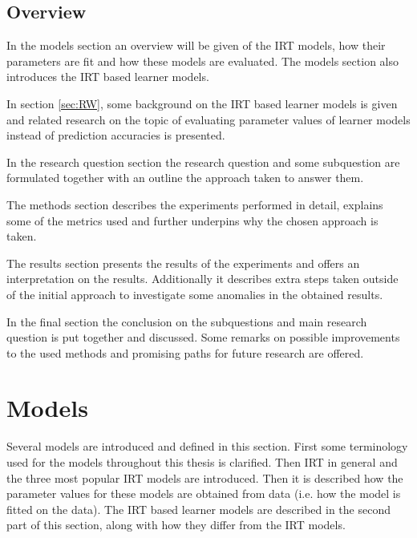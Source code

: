 \documentclass{scrartcl}
\begin{document}
\subsection{Overview}
In the models section an overview will be given of the IRT models, how their parameters are fit and how these models are evaluated. The models section also introduces the IRT based learner models.

In section \ref{sec:RW}, some background on the IRT based learner models is given and related research on the topic of evaluating parameter values of learner models instead of prediction accuracies is presented.

In the research question section the research question and some subquestion are formulated together with an outline the approach taken to answer them.

The methods section describes the experiments performed in detail, explains some of the metrics used and further underpins why the chosen approach is taken.

The results section presents the results of the experiments and offers an interpretation on the results. Additionally it describes extra steps taken outside of the initial approach to investigate some anomalies in the obtained results.

In the final section the conclusion on the subquestions and main research question is put together and discussed. Some remarks on possible improvements to the used methods and promising paths for future research are offered.

\section{Models}
Several models are introduced and defined in this section. First some terminology used for the models throughout this thesis is clarified. Then IRT in general and the three most popular IRT models are introduced. Then it is described how the parameter values for these models are obtained from data (i.e. how the model is fitted on the data). The IRT based learner models are described in the second part of this section, along with how they differ from the IRT models.
\end{document}
